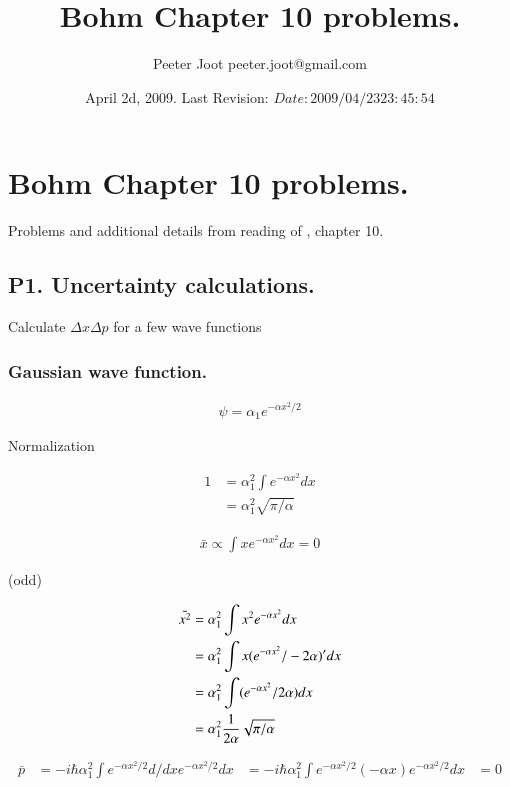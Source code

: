 \documentclass{article}
\title{ Bohm Chapter 10 problems. }
\author{Peeter Joot \quad peeter.joot@gmail.com }
\date{ April 2d, 2009.  Last Revision: $Date: 2009/04/23 23:45:54 $ }
\begin{document}
\maketitle{}
\tableofcontents
\section{ Bohm Chapter 10 problems. }

Problems and additional details from reading of \cite{bohm1989qt}, chapter 10.

\subsection{ P1. Uncertainty calculations. }

Calculate $\Delta x \Delta p$ for a few wave functions

\subsubsection{ Gaussian wave function. }

\begin{align*}
\psi = \alpha_1 e^{-\alpha x^2/2}
\end{align*}

Normalization

\begin{align*}
1 
&= \alpha_1^2 \int e^{-\alpha x^2} dx \\
&= \alpha_1^2 \sqrt{\pi/\alpha}
\end{align*}

\begin{align*}
\bar{x} \propto \int x e^{-\alpha x^2} dx = 0
\end{align*}

(odd)

\begin{align*}
\bar{x^2} 
&= \alpha_1^2 \int x^2 e^{-\alpha x^2} dx \\
&= \alpha_1^2 \int x (e^{-\alpha x^2}/-2\alpha)' dx \\
&= \alpha_1^2 \int (e^{-\alpha x^2}/2\alpha) dx \\
&= \alpha_1^2 \frac{1}{2\alpha} \sqrt{\pi/\alpha}
\end{align*}

\begin{align*}
\bar{p} 
&= -i \hbar \alpha_1^2 \int e^{-\alpha x^2 /2} d/dx e^{-\alpha x^2 /2} dx
&= -i \hbar \alpha_1^2 \int e^{-\alpha x^2 /2} (-\alpha x) e^{-\alpha x^2 /2} dx
&= 0
\end{align*}
\end{document}
